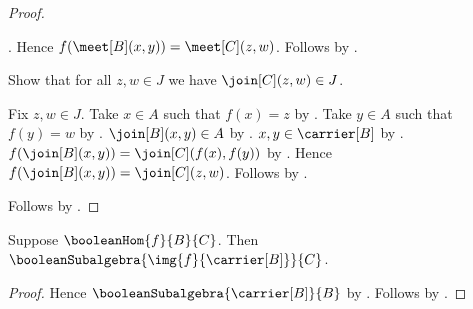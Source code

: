 \begin{proof}
\begin{subproof}
            .
        Hence $f(\meet[B](x,y))=\meet[C](z,w)$.
        Follows by .
    \end{subproof}
    Show that for all $z,w\in J$ we have $\join[C](z,w)\in J$.
    \begin{subproof}
        Fix $z,w\in J$.
        Take $x\in A$ such that $f(x)=z$ by
            .
        Take $y\in A$ such that $f(y)=w$ by
            .
        $\join[B](x,y)\in A$ by .
        $x,y\in\carrier[B]$ by .
        $f(\join[B](x,y))=\join[C](f(x),f(y))$ by
            .
        Hence $f(\join[B](x,y))=\join[C](z,w)$.
        Follows by .
    \end{subproof}
    Follows by .
\end{proof}

\begin{corollary}\label{boolean_hom_image_boolean_subalgebra}
    Suppose $\booleanHom{f}{B}{C}$.
    Then $\booleanSubalgebra{\img{f}{\carrier[B]}}{C}$.
\end{corollary}
\begin{proof}
    Hence $\booleanSubalgebra{\carrier[B]}{B}$ by
        .
    Follows by .
\end{proof}

